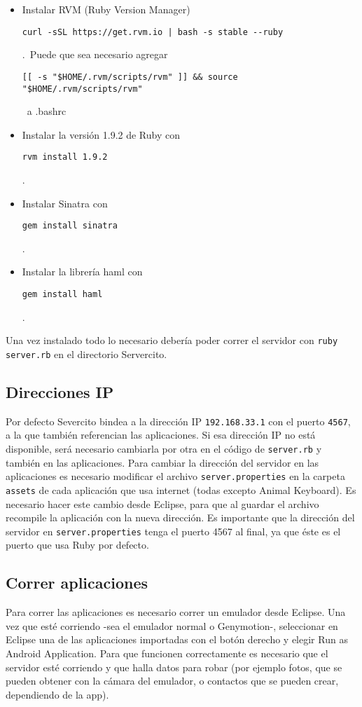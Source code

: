 		\begin{itemize}
			\item Instalar RVM (Ruby Version Manager) 	\begin{verbatim}curl -sSL https://get.rvm.io | bash -s stable --ruby\end{verbatim}.\
			Puede que sea necesario agregar \begin{verbatim}[[ -s "$HOME/.rvm/scripts/rvm" ]] && source "$HOME/.rvm/scripts/rvm"\end{verbatim}\
	a .bashrc
			\item Instalar la versión 1.9.2 de Ruby con \begin{verbatim}rvm install 1.9.2\end{verbatim}.
			\item Instalar Sinatra con \begin{verbatim}gem install sinatra\end{verbatim}.
			\item Instalar la librería haml con \begin{verbatim}gem install haml\end{verbatim}.
		\end{itemize}

		Una vez instalado todo lo necesario debería poder correr el servidor con \texttt{ruby server.rb} en el directorio Servercito.
	
	\subsection{Direcciones IP}
		Por defecto Severcito bindea a la dirección IP \texttt{192.168.33.1} con el puerto \texttt{4567}, a la que también referencian las aplicaciones. Si esa dirección IP no está disponible, será necesario cambiarla por otra en el código de \texttt{server.rb} y también en las aplicaciones. Para cambiar la dirección del servidor en las aplicaciones es necesario modificar el archivo \texttt{server.properties} en la carpeta \texttt{assets} de cada aplicación que usa internet (todas excepto Animal Keyboard). Es necesario hacer este cambio desde Eclipse, para que al guardar el archivo recompile la aplicación con la nueva dirección. Es importante que la dirección del servidor en \texttt{server.properties} tenga el puerto 4567 al 	final, ya que éste es el puerto que usa Ruby por defecto.
	
	\subsection{Correr aplicaciones}
		Para correr las aplicaciones es necesario correr un emulador desde Eclipse. Una vez que esté corriendo -sea el emulador normal o Genymotion-, seleccionar en Eclipse una de las aplicaciones importadas con el botón derecho y elegir Run as Android Application. Para que funcionen correctamente es necesario que el servidor esté corriendo y que halla datos para robar (por ejemplo fotos, que se pueden obtener con la cámara del emulador, o contactos que se pueden crear, dependiendo de la app).
